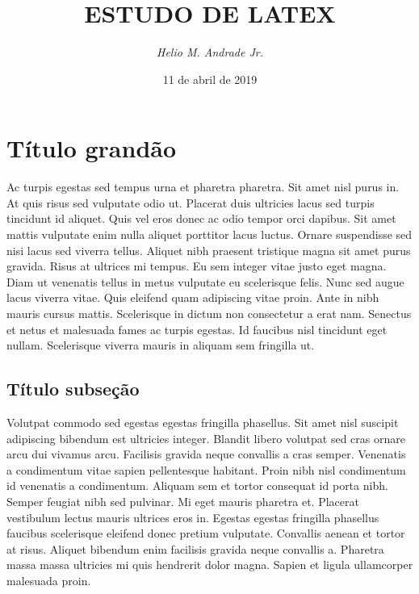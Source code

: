 \documentclass[12pt]{article}
\begin{document}
	\title{ \textbf{ESTUDO DE LATEX} } %
	\author{ \textit{Helio M. Andrade Jr.} } %
	\date{11 de abril de 2019} %
	\maketitle %
	\thispagestyle{empty} %
	\newpage
	
	
	
	\setcounter{page}{1} %
	
	\tableofcontents %
	\newpage
	
	\listoffigures %
	\newpage
	
	\listoftables %
	\newpage
	
	\setcounter{page}{1}  %
	\section{Título grand\~ao}
		Ac turpis egestas sed tempus urna et pharetra pharetra. Sit amet nisl purus in. At quis risus sed vulputate odio ut. Placerat duis ultricies lacus sed turpis tincidunt id aliquet. Quis vel eros donec ac odio tempor orci dapibus. Sit amet mattis vulputate enim nulla aliquet porttitor lacus luctus. Ornare suspendisse sed nisi lacus sed viverra tellus. Aliquet nibh praesent tristique magna sit amet purus gravida. Risus at ultrices mi tempus. Eu sem integer vitae justo eget magna. Diam ut venenatis tellus in metus vulputate eu scelerisque felis. Nunc sed augue lacus viverra vitae. Quis eleifend quam adipiscing vitae proin. Ante in nibh mauris cursus mattis. Scelerisque in dictum non consectetur a erat nam. Senectus et netus et malesuada fames ac turpis egestas. Id faucibus nisl tincidunt eget nullam. Scelerisque viverra mauris in aliquam sem fringilla ut.
		\subsection{Título subseção}
		\label{subsec:tit_subsec}
			Volutpat commodo sed egestas egestas fringilla phasellus. Sit amet nisl suscipit adipiscing bibendum est ultricies integer. Blandit libero volutpat sed cras ornare arcu dui vivamus arcu. Facilisis gravida neque convallis a cras semper. Venenatis a condimentum vitae sapien pellentesque habitant. Proin nibh nisl condimentum id venenatis a condimentum. Aliquam sem et tortor consequat id porta nibh. Semper feugiat nibh sed pulvinar. Mi eget mauris pharetra et. Placerat vestibulum lectus mauris ultrices eros in. Egestas egestas fringilla phasellus faucibus scelerisque eleifend donec pretium vulputate. Convallis aenean et tortor at risus. Aliquet bibendum enim facilisis gravida neque convallis a. Pharetra massa massa ultricies mi quis hendrerit dolor magna. Sapien et ligula ullamcorper malesuada proin.
\end{document}
